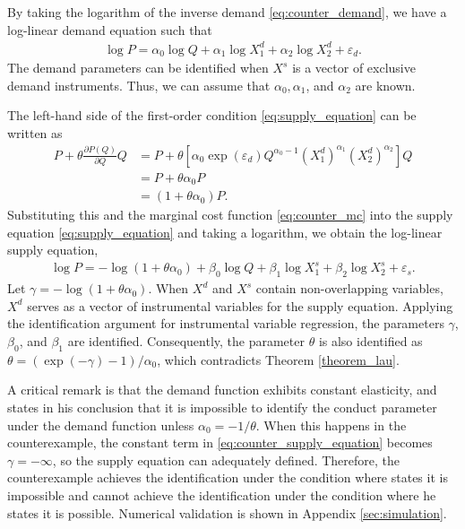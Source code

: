 \documentclass[11pt, a4paper]{article}
\theoremstyle{remark}
\begin{document}
By taking the logarithm of the inverse demand \eqref{eq:counter_demand}, we have a log-linear demand equation such that 
\begin{align}
    \log P = \alpha_0 \log Q + \alpha_1 \log X_{1}^{d}  + \alpha_2 \log X_{2}^{d} + \varepsilon_{d}.\label{eq:counter_demand_equation}
\end{align}
The demand parameters can be identified when $X^s$ is a vector of exclusive demand instruments.
Thus, we can assume that $\alpha_0, \alpha_1$, and $\alpha_2$ are known.  

The left-hand side of the first-order condition \eqref{eq:supply_equation} can be written as
\begin{align}
    P + \theta\frac{\partial P(Q)}{\partial Q}Q & =  P + \theta [\alpha_0 \exp(\varepsilon_{d})Q^{\alpha_0-1}(X_{1}^{d})^{\alpha_1}(X_{2}^{d})^{\alpha_2}] Q\\
    & = P + \theta \alpha_0 P\\
    &= (1 + \theta\alpha_0) P.
\end{align}
Substituting this and the marginal cost function \eqref{eq:counter_mc} into the supply equation \eqref{eq:supply_equation} and taking a logarithm, we obtain the log-linear supply equation,
\begin{align}
    \log P = - \log(1 + \theta\alpha_0) + \beta_0 \log Q + \beta_1 \log X_{1}^{s}+\beta_2 \log X_{2}^{s} + \varepsilon_{s}.\label{eq:counter_supply_equation}
\end{align}
Let $\gamma = - \log(1 + \theta\alpha_0)$. When $X^d$ and $X^s$ contain non-overlapping variables, $X^d$ serves as a vector of instrumental variables for the supply equation. 
Applying the identification argument for instrumental variable regression, the parameters $\gamma$, $\beta_0$, and $\beta_1$ are identified. 
Consequently, the parameter $\theta$ is also identified as $\theta = (\exp(-\gamma) - 1)/\alpha_0$, which contradicts Theorem \ref{theorem_lau}. 


A critical remark is that the demand function exhibits constant elasticity, and \citet{lau1982identifying} states in his conclusion that it is impossible to identify the conduct parameter under the demand function unless $\alpha_0 = -1/\theta$. 
When this happens in the counterexample, the constant term in \eqref{eq:counter_supply_equation} becomes $\gamma = -\infty$, so the supply equation can adequately defined.
Therefore, the counterexample achieves the identification under the condition where \citet{lau1982identifying} states it is impossible and cannot achieve the identification under the condition where he states it is possible. Numerical validation is shown in Appendix \ref{sec:simulation}.
\end{document}
